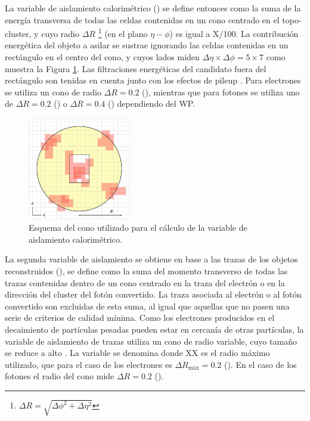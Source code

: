 La variable de aislamiento calorimétrico \cite{PERF-2017-01} () se define entonces como la suma de la energía transversa de todas las celdas contenidas en un cono centrado en el topo-cluster, y cuyo radio $\Delta R$ \footnote{$\Delta R=\sqrt{\Delta\phi^2+\Delta\eta^2}$} (en el plano $\eta-\phi$) es igual a X/100. La contribución energética del objeto a asilar se sustrae ignorando las celdas contenidas en un rectángulo en el centro del cono, y cuyos lados miden $\Delta\eta\times\Delta\phi = 5 \times 7$ como muestra la Figura \ref{IDcone}. Las filtraciones energéticas del candidato fuera del rectángulo son tenidas en cuenta junto con los efectos de pileup \cite{Cacciari}. Para electrones se utiliza un cono de radio $\Delta R = 0.2$ (), mientras que para fotones se utiliza uno de $\Delta R = 0.2$ () o $\Delta R = 0.4$ () dependiendo del WP.


\begin{figure}
\centering
  \includegraphics[width=0.4\textwidth]{images/iso.pdf}
\caption{Esquema del cono utilizado para el cálculo de la variable de aislamiento calorimétrico. 
}
  \label{IDcone}
\end{figure}


La segunda variable de aislamiento se obtiene en base a las trazas de los objetos reconstruidos (), se define como la suma del momento transverso de todas las trazas contenidas dentro de un cono centrado en la traza del electrón o en la dirección del cluster del fotón convertido. La traza asociada al electrón o al fotón convertido son excluidas de esta suma, al igual que aquellas que no pasen una serie de criterios de calidad mínima. Como los electrones producidos en el decaimiento de partículas pesadas pueden estar en cercanía de otras partículas, la variable de aislamiento de trazas utiliza un cono de radio variable, cuyo tamaño se reduce a alto \pt. La variable se denomina  donde XX es el radio máximo utilizado, que para el caso de los electrones es $\Delta R_{\text{máx}} = 0.2$ (). En el caso de los fotones el radio del cono mide $\Delta R = 0.2$ ().

